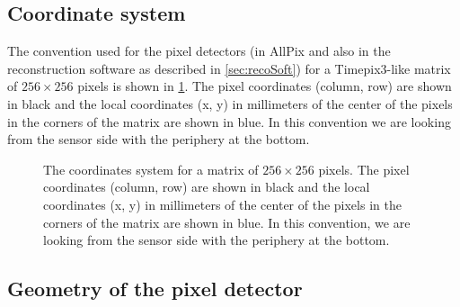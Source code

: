 \subsection{Coordinate system}

The convention used for the pixel detectors (in AllPix and also in the
reconstruction software as described in \cref{sec:recoSoft}) for a
Timepix3-like matrix of $256\times256$ pixels is shown in
\cref{fig:coordinateSystem}. The pixel coordinates (column, row) are
shown in black and the local coordinates (x, y) in millimeters of the
center of the pixels in the corners of the matrix are shown in
blue. In this convention we are looking from the sensor side with the
periphery at the bottom.

\begin{figure}[htbp]
  \centering
  \caption{The coordinates system for a matrix of $256\times256$
    pixels. The pixel coordinates (column, row) are shown in black and
    the local coordinates (x, y) in millimeters of the center of the
    pixels in the corners of the matrix are shown in blue. In this
    convention, we are looking from the sensor side with the periphery
    at the bottom.}
  \label{fig:coordinateSystem}
\end{figure}
\subsection{Geometry of the pixel detector}

